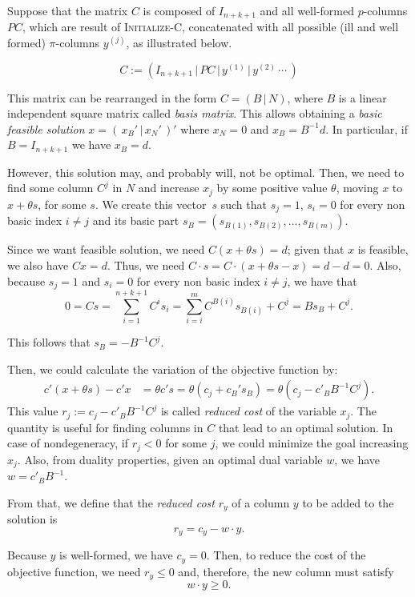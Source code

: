 Suppose that the matrix $C$ is composed of $I_{n+k+1}$ and all well-formed $p$-columns $PC$, which are result of \textsc{Initialize-C}, concatenated with all possible (ill and well formed) $\pi$-columns $y^{(j)}$, as illustrated below.

\[
	C := \left( I_{n+k+1} \, | \, PC \, | \, y^{(1)} \, | \, y^{(2)} \, \cdots \, \right)
\]

This matrix can be rearranged in the form $C = (B \, | \, N)$, where $B$ is a linear independent square matrix called \emph{basis matrix}. This allows obtaining a \emph{basic feasible solution} $x = (\, x_B' \, | \, x_N' \,)'$ where $x_N = 0$ and $x_B = B^{-1}d$. In particular, if $B = I_{n+k+1}$ we have $x_B = d$.


However, this solution may, and probably will, not be optimal. Then, we need to find some column $C^j$ in $N$ and increase $x_j$ by some positive value $\theta$, moving $x$ to $x + \theta s$, for some $s$. We create this vector~$s$ such that $s_j = 1$, $s_i = 0$ for every non basic index $i \neq j$ and its basic part $s_B = (s_{B(1)}, s_{B(2)}, \dots, s_{B(m)})$.

Since we want feasible solution, we need $C (x + \theta s) = d$; given that $x$ is feasible, we also have $C x = d$. Thus, we need $C \cdot s = C \cdot (x + \theta s - x) = d - d = 0$. Also, because $s_j = 1$ and $s_i = 0$ for every non basic index $i \neq j$, we have that
\[
	0 = C s = \sum_{i = 1}^{n + k + 1} C^i s_i = \sum_{i = i}^m C^{B(i)} s_{B(i)} + C^j = B s_B + C^j.
\]

This follows that $s_B = - B^{-1} C^j$.

Then, we could calculate the variation of the objective function by:
\begin{align*}
	c' (x + \theta s) - c'x & = \theta c's = \theta (c_j + c_B' s_B) = \theta (c_j - c'_B B^{-1} C^j).
\end{align*}
This value $r_j := c_j - c'_B B^{-1} C^j$ is called \emph{reduced cost} of the variable $x_j$. The quantity is useful for finding columns in $C$ that lead to an optimal solution. In case of nondegeneracy, if $r_j < 0$ for some $j$, we could minimize the goal increasing $x_j$. Also, from duality properties, given an optimal dual variable $w$, we have $w = c'_B B^{-1}$.

From that, we define that the \emph{reduced cost} $r_y$ of a column $y$ to be added to the solution is
\[
	r_y = c_y - w \cdot y.
\]

Because $y$ is well-formed, we have $c_y = 0$. Then, to reduce the cost of the objective function, we need $r_y \leq 0$ and, therefore, the new column must satisfy
\begin{equation}
	\label{eq:col-restr}
	w \cdot y \geq 0.
\end{equation}

